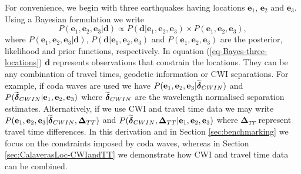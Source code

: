 \documentclass[extra, onecolumn, doublespacing]{gji}
\begin{document}
For convenience, we begin with three earthquakes having locations
$\mathbf{e}_1$, $\mathbf{e}_2$ and $\mathbf{e}_3$. Using a Bayesian
formulation we write
\begin{equation}
\label{eq-Bayes-three-locations}
P(\mathbf{e}_1, \mathbf{e}_2, \mathbf{e}_3| \mathbf{d}) \propto P( \mathbf{d}|\mathbf{e}_1, \mathbf{e}_2, \mathbf{e}_3)
\times P(\mathbf{e}_1, \mathbf{e}_2, \mathbf{e}_3),
\end{equation}
where $P(\mathbf{e}_1, \mathbf{e}_2, \mathbf{e}_3 | \mathbf{d})$,
$P(\mathbf{d}|\mathbf{e}_1, \mathbf{e}_2, \mathbf{e}_3)$ and
$P(\mathbf{e}_1, \mathbf{e}_2, \mathbf{e}_3)$ are the posterior,
likelihood and prior functions, respectively. In equation
(\ref{eq-Bayes-three-locations}) $\mathbf{d}$ represents
observations that constrain the locations. They can be any
combination of travel times, geodetic information  or CWI
separations. For example, if coda waves are used we have
$P(\mathbf{e}_1, \mathbf{e}_2, \mathbf{e}_3 |
\widetilde{\mitbf{\delta}}_{CWIN})$ and
$P(\widetilde{\mitbf{\delta}}_{CWIN}|\mathbf{e}_1, \mathbf{e}_2,
\mathbf{e}_3)$ where $\widetilde{\mitbf{\delta}}_{CWIN}$ are the
wavelength normalised separation estimates. Alternatively, if we use
CWI and travel time data we may write $P(\mathbf{e}_1, \mathbf{e}_2,
\mathbf{e}_3 | \widetilde{\mitbf{\delta}}_{CWIN},
\mathbf{\Delta}_{TT})$ and
$P(\widetilde{\mitbf{\delta}}_{CWIN},\mathbf{\Delta}_{TT}|\mathbf{e}_1,
\mathbf{e}_2, \mathbf{e}_3)$ where $\mathbf{\Delta}_{TT}$ represent
travel time differences. In this derivation and in Section
\ref{sec:benchmarking} we focus on the constraints imposed by coda
waves, whereas in Section \ref{sec:CalaverasLoc-CWIandTT} we
demonstrate how CWI and travel time data can be combined.
\end{document}
